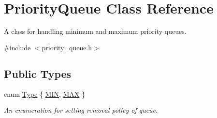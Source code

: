 \hypertarget{classPriorityQueue}{\section{Priority\+Queue Class Reference}
\label{classPriorityQueue}
}


A class for handling minimum and maximum priority queues.  




{\ttfamily \#include $<$priority\+\_\+queue.\+h$>$}

\subsection*{Public Types}
\begin{DoxyCompactItemize}
\item 
enum \hyperlink{classPriorityQueue_a5d63bb7f1eeef31a80cdff9f280f081a}{Type} \{ \hyperlink{classPriorityQueue_a5d63bb7f1eeef31a80cdff9f280f081aa594ee8d58305ad3ccb1f987007a1cb19}{M\+I\+N}, 
\hyperlink{classPriorityQueue_a5d63bb7f1eeef31a80cdff9f280f081aa427d161a5bb6967ec6d39a669f852c5d}{M\+A\+X}
 \}
\begin{DoxyCompactList}\small\item\em An enumeration for setting removal policy of queue. \end{DoxyCompactList}\end{DoxyCompactItemize}

